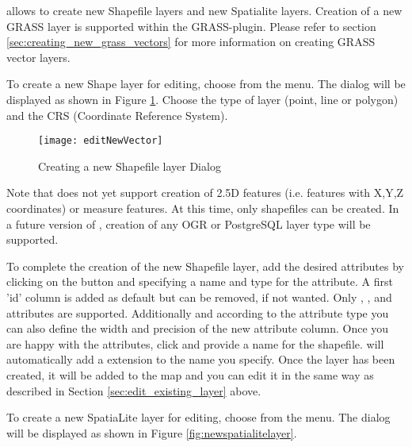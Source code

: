 \qg allows to create new Shapefile layers and new Spatialite layers.
Creation of a new GRASS layer is supported within the GRASS-plugin. Please refer
to section \ref{sec:creating_new_grass_vectors} for more information on
creating GRASS vector layers.

\label{sec:create shape}

To create a new Shape layer for editing, choose  \arrow
{} from the
 menu. The  dialog will be
displayed as shown in Figure \ref{fig:newvectorlayer}. Choose the type of
layer (point, line or polygon) and the CRS (Coordinate Reference System).

\begin{figure}[ht]
   \centering
   \texttt{[image: editNewVector]}
   \caption{Creating a new Shapefile layer Dialog \nixcaption}\label{fig:newvectorlayer}
\end{figure}

Note that \qg does not yet support creation of 2.5D
features (i.e. features with X,Y,Z coordinates) or measure features. At this
time, only shapefiles can be created. In a future version of \qg, creation of
any OGR or PostgreSQL layer type will be supported.

To complete the creation of the new Shapefile layer, add the desired attributes 
by clicking on the  button and specifying a name and type for the
attribute. A first 'id' column is added as default but can be removed, if not 
wanted. Only , , and
 attributes are supported. Additionally and
according to the attribute type you can also define the width and precision
of the new attribute column. Once you are happy with the attributes, click
 and provide a name for the shapefile. \qg will automatically add
a  extension to the name you specify. Once
the layer has been created, it will be added to the map and you can edit it in
the same way as described in Section \ref{sec:edit_existing_layer} above.

\label{sec:create spatialite}

To create a new SpatiaLite layer for editing, choose  \arrow
{} from the
 menu. The  dialog will be
displayed as shown in Figure \ref{fig:newspatialitelayer}.

